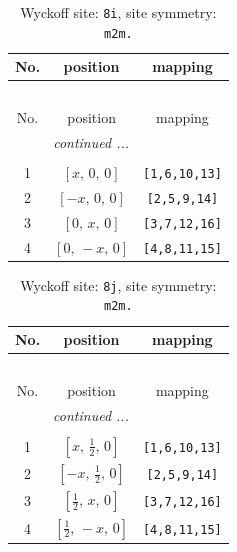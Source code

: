 \documentclass[fleqn,8pt]{jsarticle}
\begin{document}
\renewcommand{\arraystretch}{1.2}
\begin{longtable}{ccc}
\caption{Wyckoff site: {\tt 8i}, site symmetry: {\tt m2m.}}
 \\
 \hline \hline
No. & position & mapping \\ \hline \endfirsthead

\multicolumn{2}{l}{\tablename\ \thetable{}} \\
 \hline \hline
No. & position & mapping \\ \hline \endhead

 \hline \hline
\multicolumn{2}{r}{\footnotesize\it continued ...} \\ \endfoot

 \hline \hline
\multicolumn{2}{r}{} \\ \endlastfoot

1 & $\left[ x,\, 0,\, 0 \right]$ & {\tt [1,6,10,13]} \\ \hline
2 & $\left[ - x,\, 0,\, 0 \right]$ & {\tt [2,5,9,14]} \\ \hline
3 & $\left[ 0,\, x,\, 0 \right]$ & {\tt [3,7,12,16]} \\ \hline
4 & $\left[ 0,\, - x,\, 0 \right]$ & {\tt [4,8,11,15]} \\
\end{longtable}
\renewcommand{\arraystretch}{1.2}
\begin{longtable}{ccc}
\caption{Wyckoff site: {\tt 8j}, site symmetry: {\tt m2m.}}
 \\
 \hline \hline
No. & position & mapping \\ \hline \endfirsthead

\multicolumn{2}{l}{\tablename\ \thetable{}} \\
 \hline \hline
No. & position & mapping \\ \hline \endhead

 \hline \hline
\multicolumn{2}{r}{\footnotesize\it continued ...} \\ \endfoot

 \hline \hline
\multicolumn{2}{r}{} \\ \endlastfoot

1 & $\left[ x,\, \frac{1}{2},\, 0 \right]$ & {\tt [1,6,10,13]} \\ \hline
2 & $\left[ - x,\, \frac{1}{2},\, 0 \right]$ & {\tt [2,5,9,14]} \\ \hline
3 & $\left[ \frac{1}{2},\, x,\, 0 \right]$ & {\tt [3,7,12,16]} \\ \hline
4 & $\left[ \frac{1}{2},\, - x,\, 0 \right]$ & {\tt [4,8,11,15]} \\
\end{longtable}
\end{document}
